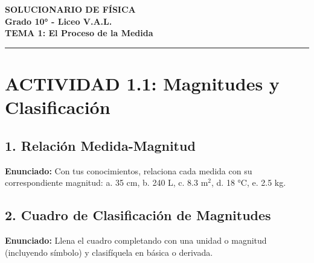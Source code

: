 \documentclass[12pt, letterpaper]{article}
\begin{document}
	
	\begin{center}
		{\Huge \textbf{SOLUCIONARIO DE FÍSICA}}\\[0.2cm]
		{\LARGE \textbf{Grado 10° - Liceo V.A.L.}}\\[0.3cm]
		{\Large \textbf{TEMA 1: El Proceso de la Medida}}\\[0.1cm]
		\hrule
	\end{center}
	
	\vspace{0.5cm}
	
	\section*{ACTIVIDAD 1.1: Magnitudes y Clasificación}
	
	\subsection*{1. Relación Medida-Magnitud}
	\noindent \textbf{Enunciado:} Con tus conocimientos, relaciona cada medida con su correspondiente magnitud: a. 35 cm, b. 240 L, c. 8.3 m$^2$, d. 18 °C, e. 2.5 kg.
	
	
	\subsection*{2. Cuadro de Clasificación de Magnitudes}
	\noindent \textbf{Enunciado:} Llena el cuadro completando con una unidad o magnitud (incluyendo símbolo) y clasifíquela en básica o derivada.
	
\end{document}
